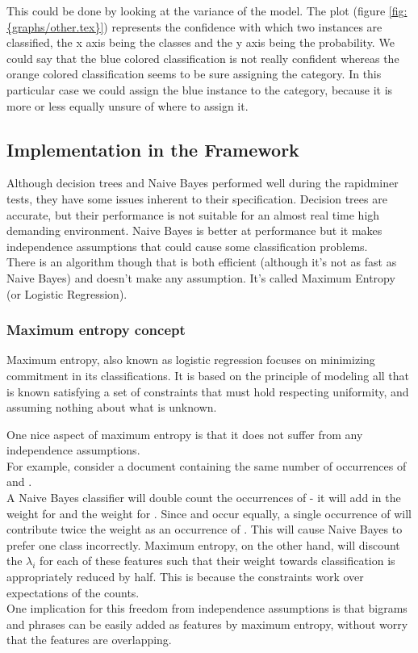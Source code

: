 

This could be done by looking at the variance of the model. The plot (figure \ref{fig:{graphs/other.tex}}) represents the confidence with which two instances are classified, the x axis being the classes
and the y axis being the probability. We could say that the blue colored classification is not really confident whereas the orange colored classification seems to be sure assigning the  
category. In this particular case we could assign the blue instance to the  category, because it is more or less equally unsure of where to assign it.


\subsection{Implementation in the Framework}
Although decision trees and Naive Bayes performed well during the rapidminer tests, they have some issues inherent to their specification. Decision trees are accurate, but their performance is 
not suitable for an almost real time high demanding environment. Naive Bayes is better at performance but it makes independence assumptions that could cause some classification problems.\\
There is an algorithm though that is both efficient (although it's not as fast as Naive Bayes) and doesn't make any assumption. It's called Maximum Entropy (or Logistic Regression).

\subsubsection{Maximum entropy concept}
Maximum entropy, also known as logistic regression focuses on minimizing commitment in its classifications. It is based on the principle of modeling all that is known satisfying a set of constraints
that must hold respecting uniformity, and assuming nothing about what is unknown.

One nice aspect of maximum entropy is that it does not suffer from any independence assumptions.\\
For example, consider a document containing the same number of occurrences of  and .\\
A Naive Bayes classifier will double count the occurrences of  
- it will add in the weight for  and the weight for . Since  and
 occur equally, a single occurrence of  will contribute twice the weight as an occurrence of . This will cause Naive Bayes to prefer one class 
incorrectly.
Maximum entropy, on the other hand, will discount the $\lambda_i$ for each of these features such that their weight towards classification is appropriately reduced by half.
This is because the constraints work over expectations of the counts. \\
One implication for this freedom from independence assumptions is that bigrams and phrases can be easily added as features by maximum entropy, without worry that the features are overlapping.


